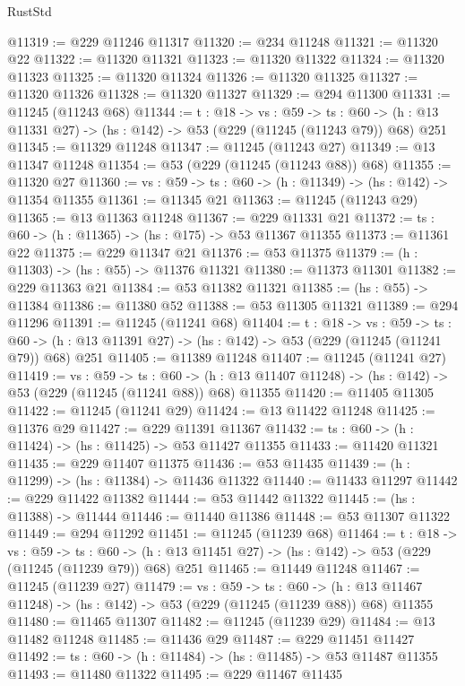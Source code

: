 \begin{lexlean}{RustStd}
\begin{coremodule}
@11319 := @229 @11246 @11317
@11320 := @234 @11248
@11321 := @11320 @22
@11322 := @11320 @11321
@11323 := @11320 @11322
@11324 := @11320 @11323
@11325 := @11320 @11324
@11326 := @11320 @11325
@11327 := @11320 @11326
@11328 := @11320 @11327
@11329 := @294 @11300
@11331 := @11245 (@11243 @68)
@11344 := {t : @18} ->
  {vs : @59} ->
  {ts : @60} -> (h : @13 @11331 @27) -> (hs : @142) -> @53 (@229 (@11245 (@11243 @79)) @68) @251
@11345 := @11329 @11248
@11347 := @11245 (@11243 @27)
@11349 := @13 @11347 @11248
@11354 := @53 (@229 (@11245 (@11243 @88)) @68)
@11355 := @11320 @27
@11360 := {vs : @59} -> {ts : @60} -> (h : @11349) -> (hs : @142) -> @11354 @11355
@11361 := @11345 @21
@11363 := @11245 (@11243 @29)
@11365 := @13 @11363 @11248
@11367 := @229 @11331 @21
@11372 := {ts : @60} -> (h : @11365) -> (hs : @175) -> @53 @11367 @11355
@11373 := @11361 @22
@11375 := @229 @11347 @21
@11376 := @53 @11375
@11379 := (h : @11303) -> (hs : @55) -> @11376 @11321
@11380 := @11373 @11301
@11382 := @229 @11363 @21
@11384 := @53 @11382 @11321
@11385 := (hs : @55) -> @11384
@11386 := @11380 @52
@11388 := @53 @11305 @11321
@11389 := @294 @11296
@11391 := @11245 (@11241 @68)
@11404 := {t : @18} ->
  {vs : @59} ->
  {ts : @60} -> (h : @13 @11391 @27) -> (hs : @142) -> @53 (@229 (@11245 (@11241 @79)) @68) @251
@11405 := @11389 @11248
@11407 := @11245 (@11241 @27)
@11419 := {vs : @59} ->
  {ts : @60} ->
  (h : @13 @11407 @11248) -> (hs : @142) -> @53 (@229 (@11245 (@11241 @88)) @68) @11355
@11420 := @11405 @11305
@11422 := @11245 (@11241 @29)
@11424 := @13 @11422 @11248
@11425 := @11376 @29
@11427 := @229 @11391 @11367
@11432 := {ts : @60} -> (h : @11424) -> (hs : @11425) -> @53 @11427 @11355
@11433 := @11420 @11321
@11435 := @229 @11407 @11375
@11436 := @53 @11435
@11439 := (h : @11299) -> (hs : @11384) -> @11436 @11322
@11440 := @11433 @11297
@11442 := @229 @11422 @11382
@11444 := @53 @11442 @11322
@11445 := (hs : @11388) -> @11444
@11446 := @11440 @11386
@11448 := @53 @11307 @11322
@11449 := @294 @11292
@11451 := @11245 (@11239 @68)
@11464 := {t : @18} ->
  {vs : @59} ->
  {ts : @60} -> (h : @13 @11451 @27) -> (hs : @142) -> @53 (@229 (@11245 (@11239 @79)) @68) @251
@11465 := @11449 @11248
@11467 := @11245 (@11239 @27)
@11479 := {vs : @59} ->
  {ts : @60} ->
  (h : @13 @11467 @11248) -> (hs : @142) -> @53 (@229 (@11245 (@11239 @88)) @68) @11355
@11480 := @11465 @11307
@11482 := @11245 (@11239 @29)
@11484 := @13 @11482 @11248
@11485 := @11436 @29
@11487 := @229 @11451 @11427
@11492 := {ts : @60} -> (h : @11484) -> (hs : @11485) -> @53 @11487 @11355
@11493 := @11480 @11322
@11495 := @229 @11467 @11435

\end{coremodule}
\end{lexlean}
